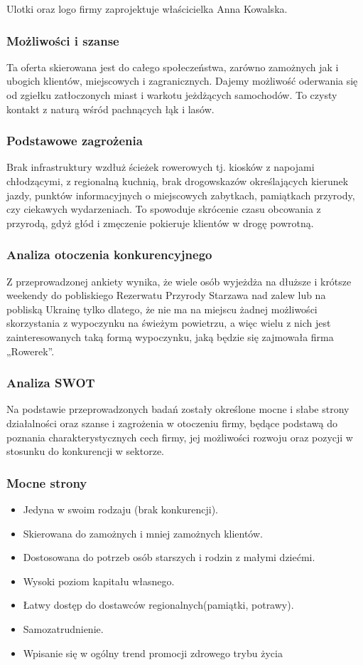 \documentclass{sprawozdanie-agh}
\begin{document}
		Ulotki oraz logo firmy zaprojektuje właścicielka Anna Kowalska.

		\subsubsection{Możliwości i szanse}
		Ta oferta skierowana jest do całego społeczeństwa, zarówno zamożnych jak i ubogich klientów, miejscowych i zagranicznych. Dajemy możliwość oderwania się od zgiełku zatłoczonych miast i warkotu jeżdżących samochodów. To czysty kontakt z naturą wśród pachnących łąk i lasów.

		\subsubsection{Podstawowe zagrożenia}
		Brak infrastruktury wzdłuż ścieżek rowerowych tj. kiosków z napojami chłodzącymi, z regionalną kuchnią, brak drogowskazów określających kierunek jazdy, punktów informacyjnych o miejscowych zabytkach, pamiątkach przyrody, czy ciekawych wydarzeniach. To spowoduje skrócenie czasu obcowania z przyrodą, gdyż głód i zmęczenie pokieruje klientów w drogę powrotną.

		\subsubsection{Analiza otoczenia konkurencyjnego}
		Z przeprowadzonej ankiety wynika, że wiele osób wyjeżdża na dłuższe i krótsze weekendy do pobliskiego Rezerwatu Przyrody Starzawa nad zalew lub na pobliską Ukrainę tylko dlatego, że nie ma na miejscu żadnej możliwości skorzystania z wypoczynku na świeżym powietrzu, a więc wielu z nich jest zainteresowanych taką formą wypoczynku, jaką będzie się zajmowała firma „Rowerek”.

		\subsubsection{Analiza SWOT}
		Na podstawie przeprowadzonych badań zostały określone mocne i słabe strony działalności oraz szanse i zagrożenia w otoczeniu firmy, będące podstawą do poznania charakterystycznych cech firmy, jej możliwości rozwoju oraz pozycji w stosunku do konkurencji w sektorze.
		\subsubsection{Mocne strony}

		\begin{itemize}
			\item Jedyna w swoim rodzaju (brak konkurencji).
			\item Skierowana do zamożnych i mniej zamożnych klientów.
			\item Dostosowana do potrzeb osób starszych i rodzin z małymi dziećmi.
			\item Wysoki poziom kapitału własnego.
			\item Łatwy dostęp do dostawców regionalnych(pamiątki, potrawy).
			\item Samozatrudnienie.
			\item Wpisanie się w ogólny trend promocji zdrowego trybu życia
		\end{itemize}
\end{document}
